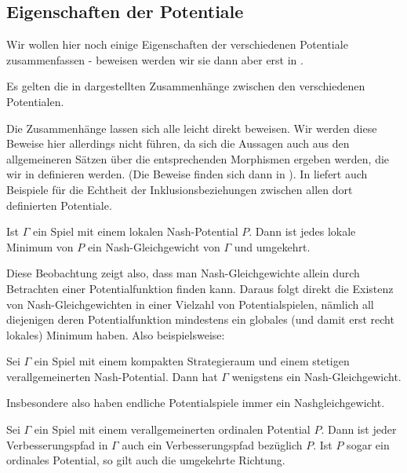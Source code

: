 \subsection{Eigenschaften der Potentiale}

Wir wollen hier noch einige Eigenschaften der verschiedenen Potentiale zusammenfassen - beweisen werden wir sie dann aber erst in .

\begin{satz}\label{satz:ZusammenaengePotentiale}
	Es gelten die in  dargestellten Zusammenhänge zwischen den verschiedenen Potentialen.
\end{satz}

Die Zusammenhänge lassen sich alle leicht direkt beweisen. Wir werden diese Beweise hier allerdings nicht führen, da sich die Aussagen auch aus den allgemeineren Sätzen über die entsprechenden Morphismen ergeben werden, die wir in  definieren werden. (Die Beweise finden sich dann in ). In \cite[Beispiele 4.1, 4.2 und 4.3]{BestRespPot} liefert \citeauthor{BestRespPot} auch Beispiele für die Echtheit der Inklusionsbeziehungen zwischen allen dort definierten Potentiale.

\begin{beob}\label{beob:lokMinNG}
	Ist $\Gamma$ ein Spiel mit einem lokalen Nash-Potential $P$. Dann ist jedes lokale Minimum von $P$ ein Nash-Gleichgewicht von $\Gamma$ und umgekehrt.
\end{beob}

Diese Beobachtung zeigt also, dass man Nash-Gleichgewichte allein durch Betrachten einer Potentialfunktion finden kann. Daraus folgt direkt die Existenz von Nash-Gleichgewichten in einer Vielzahl von Potentialspielen, nämlich all diejenigen deren Potentialfunktion mindestens ein globales (und damit erst recht lokales) Minimum haben. Also beispielsweise:

\begin{kor}
	Sei $\Gamma$ ein Spiel mit einem kompakten Strategieraum und einem stetigen verallgemeinerten Nash-Potential. Dann hat $\Gamma$ wenigstens ein Nash-Gleichgewicht.
\end{kor}

Insbesondere also haben endliche Potentialspiele immer ein Nashgleichgewicht. 

\begin{satz}\label{prop:ordPotVerbpfad}
	Sei $\Gamma$ ein Spiel mit einem verallgemeinerten ordinalen Potential $P$. Dann ist jeder Verbesserungspfad in $\Gamma$ auch ein Verbesserungspfad bezüglich $P$. Ist $P$ sogar ein ordinales Potential, so gilt auch die umgekehrte Richtung.
\end{satz}

